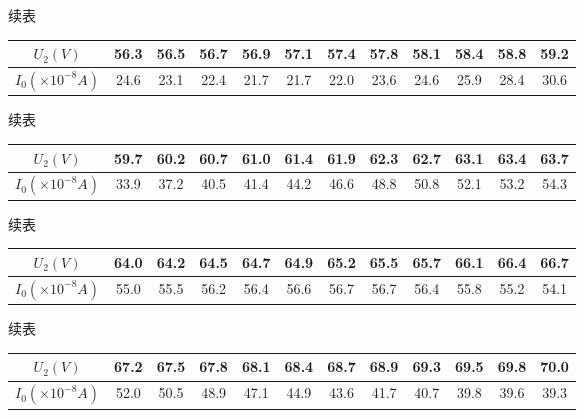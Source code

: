 \documentclass{article}
\begin{document}
    续表

    \begin{center}
        \begin{tabular}{|c|c|c|c|c|c|c|c|c|c|c|c|}
            \hline
            $U_2(V)$ & 56.3  & 56.5  & 56.7  & 56.9  & 57.1  & 57.4  & 57.8  & 58.1  & 58.4  & 58.8  & 59.2  \bigstrut\\
            \hline
            $I_0(\times 10^{-8}A)$ & 24.6  & 23.1  & 22.4  & 21.7  & 21.7  & 22.0  & 23.6  & 24.6  & 25.9  & 28.4  & 30.6  \bigstrut\\
            \hline
        \end{tabular}%
    \end{center}

    续表

    \begin{center}
        \begin{tabular}{|c|c|c|c|c|c|c|c|c|c|c|c|}
            \hline
            $U_2(V)$ & 59.7  & 60.2  & 60.7  & 61.0  & 61.4  & 61.9  & 62.3  & 62.7  & 63.1  & 63.4  & 63.7  \bigstrut\\
            \hline
            $I_0(\times 10^{-8}A)$ & 33.9  & 37.2  & 40.5  & 41.4  & 44.2  & 46.6  & 48.8  & 50.8  & 52.1  & 53.2  & 54.3  \bigstrut\\
            \hline
        \end{tabular}%
    \end{center}

    续表

    \begin{center}
        \begin{tabular}{|c|c|c|c|c|c|c|c|c|c|c|c|}
            \hline
            $U_2(V)$ & 64.0  & 64.2  & 64.5  & 64.7  & 64.9  & 65.2  & 65.5  & 65.7  & 66.1  & 66.4  & 66.7  \bigstrut\\
            \hline
            $I_0(\times 10^{-8}A)$ & 55.0  & 55.5  & 56.2  & 56.4  & 56.6  & 56.7  & 56.7  & 56.4  & 55.8  & 55.2  & 54.1  \bigstrut\\
            \hline
        \end{tabular}%
    \end{center}

    续表

    \begin{center}
        \begin{tabular}{|c|c|c|c|c|c|c|c|c|c|c|c|}
            \hline
            $U_2(V)$ & 67.2  & 67.5  & 67.8  & 68.1  & 68.4  & 68.7  & 68.9  & 69.3  & 69.5  & 69.8  & 70.0  \bigstrut\\
            \hline
            $I_0(\times 10^{-8}A)$ & 52.0  & 50.5  & 48.9  & 47.1  & 44.9  & 43.6  & 41.7  & 40.7  & 39.8  & 39.6  & 39.3  \bigstrut\\
            \hline
        \end{tabular}%
    \end{center}
\end{document}
